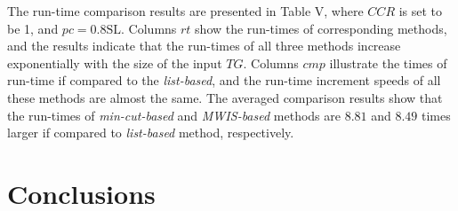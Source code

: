 \documentclass[10pt,journal]{IEEEtran}
\begin{document}
The run-time comparison results are presented in Table V, where $CCR$ is set to be 1, and $pc=0.8\mathrm{SL}$. Columns $rt$ show the run-times of corresponding methods, and the results indicate that the run-times of all three methods increase exponentially with the size of the input $TG$. Columns $cmp$ illustrate the times of run-time if compared to the \textit{list-based}, and the run-time increment speeds of all these methods are almost the same. The averaged comparison results show that the run-times of \textit{min-cut-based} and \textit{MWIS-based} methods are $8.81$ and $8.49$ times larger if compared to \textit{list-based} method, respectively.





\section{Conclusions}
\end{document}
